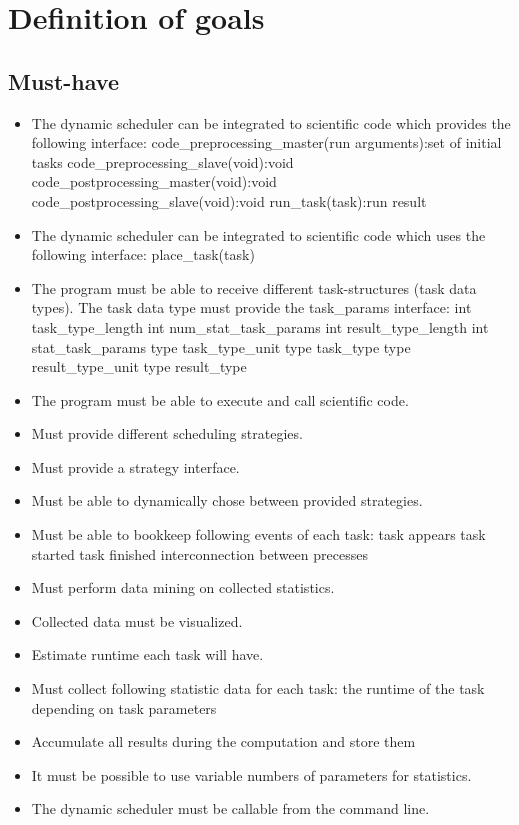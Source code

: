 \section{Definition of goals}
	\subsection{Must-have}
		\begin{itemize}
			\item The dynamic scheduler can be integrated to scientific code which provides the following interface:
				\subitem code\_preprocessing\_master(run arguments):set of initial tasks
				\subitem code\_preprocessing\_slave(void):void
				\subitem code\_postprocessing\_master(void):void
				\subitem code\_postprocessing\_slave(void):void
				\subitem run\_task(task):run result
			\item The dynamic scheduler can be integrated to scientific code which uses the following interface:
				\subitem place\_task(task)
			\item The program must be able to receive different task-structures (task data types). The task data type must provide the task\_params interface:
				\subitem int task\_type\_length
				\subitem int num\_stat\_task\_params
				\subitem int result\_type\_length
				\subitem int stat\_task\_params
				\subitem type task\_type\_unit
				\subitem type task\_type
				\subitem type result\_type\_unit
				\subitem type result\_type
				
			\item The program must be able to execute and call scientific code.
			\item Must provide different scheduling strategies.
			\item Must provide a strategy interface.
			\item Must be able to dynamically chose between provided strategies.
			\item Must be able to bookkeep following events of each task:
				\subitem task appears
				\subitem task started
				\subitem task finished
				\subitem interconnection between precesses
			\item Must perform data mining on collected statistics.
			\item Collected data must be visualized.
			\item Estimate runtime each task will have.
			\item Must collect following statistic data for each task:
				\subitem the runtime of the task depending on task parameters
			\item Accumulate all results during the computation and store them
			\item It must be possible to use variable numbers of parameters for statistics.
			\item The dynamic scheduler must be callable from the command line.
		\end{itemize}
